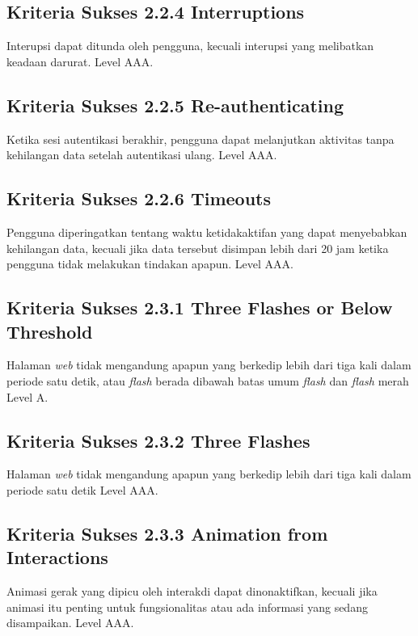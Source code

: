 \subsection{Kriteria Sukses 2.2.4 Interruptions}
\label{sec:kriteria_2.2.4}
Interupsi dapat ditunda oleh pengguna, kecuali interupsi yang melibatkan keadaan darurat.
Level AAA.

\subsection{Kriteria Sukses 2.2.5 Re-authenticating}
\label{sec:kriteria_2.2.5}
Ketika sesi autentikasi berakhir, pengguna dapat melanjutkan aktivitas tanpa kehilangan data setelah autentikasi ulang.
Level AAA.

\subsection{Kriteria Sukses 2.2.6 Timeouts}
\label{sec:kriteria_2.2.6}
Pengguna diperingatkan tentang waktu ketidakaktifan yang dapat menyebabkan kehilangan data, kecuali jika data tersebut disimpan lebih dari 20 jam ketika pengguna tidak melakukan tindakan apapun.
Level AAA.

\subsection{Kriteria Sukses 2.3.1 Three Flashes or Below Threshold}
\label{sec:kriteria_2.3.1}
Halaman \textit{web} tidak mengandung apapun yang berkedip lebih dari tiga kali dalam periode satu detik, atau \textit{flash} berada dibawah batas umum \textit{flash} dan \textit{flash} merah
Level A.

\subsection{Kriteria Sukses 2.3.2 Three Flashes}
\label{sec:kriteria_2.3.2}
Halaman \textit{web} tidak mengandung apapun yang berkedip lebih dari tiga kali dalam periode satu detik
Level AAA.

\subsection{Kriteria Sukses 2.3.3 Animation from Interactions}
\label{sec:kriteria_2.3.3}
Animasi gerak yang dipicu oleh interakdi dapat dinonaktifkan, kecuali jika animasi itu penting untuk fungsionalitas atau ada informasi yang sedang disampaikan.
Level AAA.

